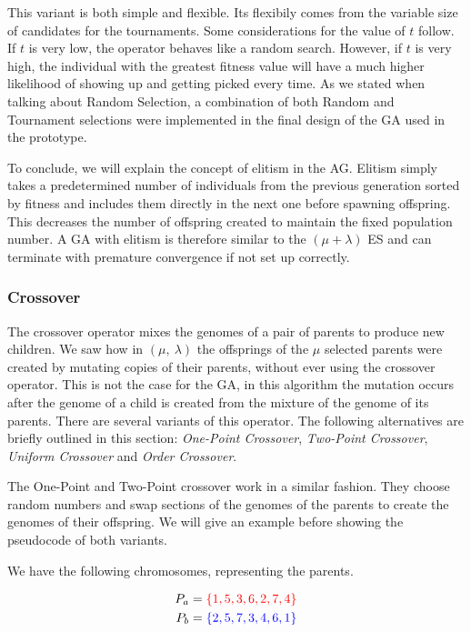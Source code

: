 This variant is both simple and flexible. Its flexibily comes from the variable size of candidates for the tournaments. Some considerations for the value of $t$ follow. If $t$ is very low, the operator behaves like a random search. However, if $t$ is very high, the individual with the greatest fitness value will have a much higher likelihood of showing up and getting picked every time. As we stated when talking about Random Selection, a combination of both Random and Tournament selections were implemented in the final design of the GA used in the prototype.

To conclude, we will explain the concept of elitism in the AG. Elitism simply takes a predetermined number of individuals from the previous generation sorted by fitness and includes them directly in the next one before spawning offspring. This decreases the number of offspring created to maintain the fixed population number. A GA with elitism is therefore similar to the $(\mu + \lambda)$ ES and can terminate with premature convergence if not set up correctly. 


\subsubsection{Crossover}

The crossover operator mixes the genomes of a pair of parents to produce new children. We saw how in $(\mu,\ \lambda)$ the offsprings of the $\mu$ selected parents were created by mutating copies of their parents, without ever using the crossover operator. This is not the case for the GA, in this algorithm the mutation occurs after the genome of a child is created from the mixture of the genome of its parents. There are several variants of this operator. The following alternatives are briefly outlined in this section: \textit{One-Point Crossover}, \textit{Two-Point Crossover}, \textit{Uniform Crossover} and \textit{Order Crossover}.

The One-Point and Two-Point crossover work in a similar fashion. They choose random numbers and swap sections of the genomes of the parents to create the genomes of their offspring. We will give an example before showing the pseudocode of both variants.

We have the following chromosomes, representing the parents.

\begin{align}
    P_{a} &= \color{red} \{ 1, 5, 3, 6, 2, 7, 4 \}\\
    P_{b} &= \color{blue} \{ 2, 5, 7, 3, 4, 6, 1 \}
\end{align}

